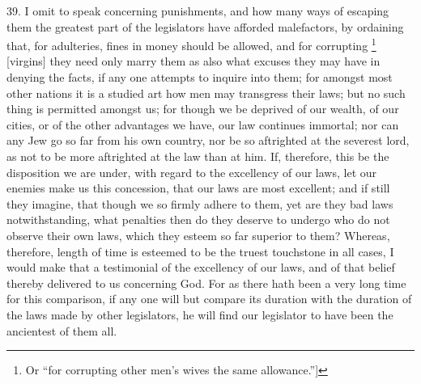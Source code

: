 39. I omit to speak concerning punishments, and how many ways of escaping
them the greatest part of the legislators have afforded malefactors, by
ordaining that, for adulteries, fines in money should be allowed, and for
corrupting \footnote{Or ``for corrupting other
men's wives the same allowance.'']} [virgins] they need only marry
them as also what excuses they may have in denying the facts, if any one
attempts to inquire into them; for amongst most other nations it is a
studied art how men may transgress their laws; but no such thing is
permitted amongst us; for though we be deprived of our wealth, of our
cities, or of the other advantages we have, our law continues immortal;
nor can any Jew go so far from his own country, nor be so aftrighted at
the severest lord, as not to be more aftrighted at the law than at him.
If, therefore, this be the disposition we are under, with regard to the
excellency of our laws, let our enemies make us this concession, that our
laws are most excellent; and if still they imagine, that though we so
firmly adhere to them, yet are they bad laws notwithstanding, what
penalties then do they deserve to undergo who do not observe their own
laws, which they esteem so far superior to them? Whereas, therefore,
length of time is esteemed to be the truest touchstone in all cases, I
would make that a testimonial of the excellency of our laws, and of that
belief thereby delivered to us concerning God. For as there hath been a
very long time for this comparison, if any one will but compare its
duration with the duration of the laws made by other legislators, he will
find our legislator to have been the ancientest of them all.

